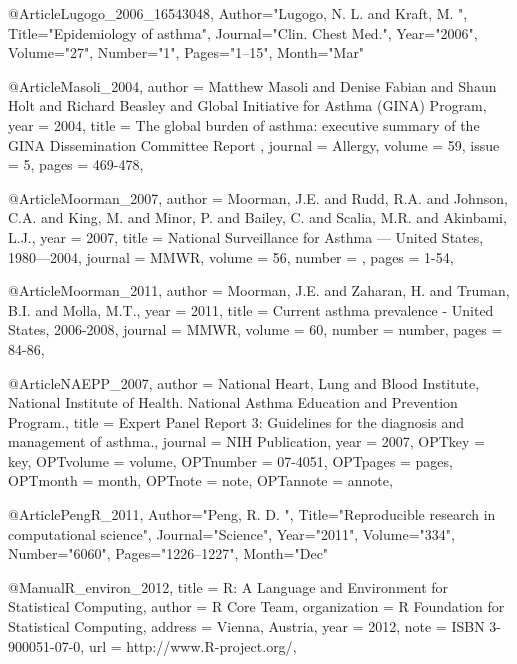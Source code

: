 {{{@Article{Lugogo_2006_16543048,
   Author="Lugogo, N. L.  and Kraft, M. ",
   Title="{{E}pidemiology of asthma}",
   Journal="Clin. Chest Med.",
   Year="2006",
   Volume="27",
   Number="1",
   Pages="1--15",
   Month="Mar"
}


@Article{Masoli_2004,
  author = {Matthew Masoli and Denise Fabian and Shaun Holt and Richard Beasley and Global Initiative for Asthma (GINA) Program},
  year = {2004},
  title = {The global burden of asthma: executive summary of the GINA Dissemination Committee Report
  },
  journal = Allergy,
  volume =  {59},
  issue = {5},
  pages = {469-478},
}

@Article{Moorman_2007,
  author = {Moorman, J.E. and Rudd, R.A. and Johnson, C.A. and King, M. and Minor, P. and Bailey, C. and Scalia, M.R. and Akinbami, L.J.},
  year = {2007},
  title = {National Surveillance for Asthma --- United States, 1980—2004},
  journal = MMWR,
  volume =  {56},
  number = {},
  pages = {1-54},
}


@Article{Moorman_2011,
  author = {Moorman, J.E. and Zaharan, H. and Truman, B.I. and Molla, M.T.},
  year = {2011},
  title = {Current asthma prevalence - United States, 2006-2008},
  journal = MMWR,
  volume =  {60},
  number = {number},
  pages = {84-86},
}


@Article{NAEPP_2007,
author = {National Heart, Lung and Blood Institute, National Institute of Health. National Asthma Education and Prevention Program.},
title = {Expert Panel Report 3: Guidelines for the diagnosis and management of asthma.},
journal = {NIH Publication},
year = {2007},
OPTkey = {key},
OPTvolume = {volume},
OPTnumber = {07-4051},
OPTpages = {pages},
OPTmonth = {month},
OPTnote = {note},
OPTannote = {annote},
}



@Article{PengR_2011,
   Author="Peng, R. D. ",
   Title="{{R}eproducible research in computational science}",
   Journal="Science",
   Year="2011",
   Volume="334",
   Number="6060",
   Pages="1226--1227",
   Month="Dec"
}




@Manual{R_environ_2012,
    title = {R: A Language and Environment for Statistical Computing},
    author = {{R Core Team}},
    organization = {R Foundation for Statistical Computing},
    address = {Vienna, Austria},
    year = {2012},
    note = {{ISBN} 3-900051-07-0},
    url = {http://www.R-project.org/},
  }


}}}
